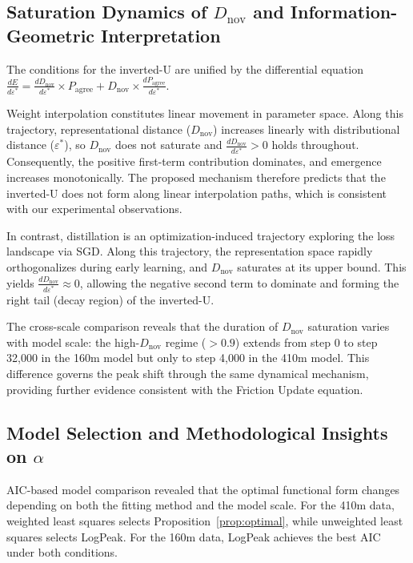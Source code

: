 \documentclass[11pt,a4paper]{article}
\begin{document}
\subsection{Saturation Dynamics of $D_\mathrm{nov}$ and Information-Geometric Interpretation}

The conditions for the inverted-U are unified by the differential equation
$\frac{dE}{d\varepsilon^*} = \frac{dD_\mathrm{nov}}{d\varepsilon^*} \times P_\mathrm{agree}
+ D_\mathrm{nov} \times \frac{dP_\mathrm{agree}}{d\varepsilon^*}$.

Weight interpolation constitutes linear movement in parameter space. Along this trajectory,
representational distance ($D_\mathrm{nov}$) increases linearly with distributional distance
($\varepsilon^*$), so $D_\mathrm{nov}$ does not saturate and
$\frac{dD_\mathrm{nov}}{d\varepsilon^*} > 0$ holds throughout. Consequently, the positive
first-term contribution dominates, and emergence increases monotonically. The proposed mechanism
therefore predicts that the inverted-U does not form along linear interpolation paths, which is
consistent with our experimental observations.

In contrast, distillation is an optimization-induced trajectory exploring the loss landscape
via SGD.
Along this trajectory, the representation space rapidly orthogonalizes during early learning,
and $D_\mathrm{nov}$ saturates at its upper bound. This yields
$\frac{dD_\mathrm{nov}}{d\varepsilon^*} \approx 0$, allowing the negative second term to
dominate and forming the right tail (decay region) of the inverted-U.

The cross-scale comparison reveals that the duration of $D_\mathrm{nov}$ saturation varies
with model scale: the high-$D_\mathrm{nov}$ regime ($> 0.9$) extends from step 0 to step
32,000 in the 160m model but only to step 4,000 in the 410m model. This difference governs
the peak shift through the same dynamical mechanism, providing further evidence consistent with
the Friction Update equation.

\subsection{Model Selection and Methodological Insights on $\alpha$}

AIC-based model comparison revealed that the optimal functional form changes depending on both
the fitting method and the model scale. For the 410m data, weighted least squares selects
Proposition~\ref{prop:optimal}, while unweighted least squares selects LogPeak. For the 160m data, LogPeak
achieves the best AIC under both conditions.
\end{document}

